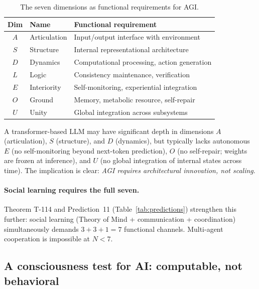 \begin{table}[H]
\centering
\caption{The seven dimensions as functional requirements for AGI.}
\label{tab:seven-agi}
\small
\begin{tabular}{@{}cll@{}}
\toprule
\textbf{Dim} & \textbf{Name} & \textbf{Functional requirement} \\
\midrule
$A$ & Articulation & Input/output interface with environment \\
$S$ & Structure    & Internal representational architecture \\
$D$ & Dynamics     & Computational processing, action generation \\
$L$ & Logic        & Consistency maintenance, verification \\
$E$ & Interiority  & Self-monitoring, experiential integration \\
$O$ & Ground       & Memory, metabolic resource, self-repair \\
$U$ & Unity        & Global integration across subsystems \\
\bottomrule
\end{tabular}
\end{table}

A transformer-based LLM may have significant depth in dimensions $A$
(articulation), $S$ (structure), and $D$ (dynamics), but typically lacks
autonomous $E$ (no self-monitoring beyond next-token prediction), $O$
(no self-repair; weights are frozen at inference), and $U$ (no global
integration of internal states across time).  The implication is clear:
\emph{AGI requires architectural innovation, not scaling}.

\paragraph{Social learning requires the full seven.}
Theorem T-114  and Prediction~11 (Table~\ref{tab:predictions})
strengthen this further: social learning (Theory of Mind + communication +
coordination) simultaneously demands $3 + 3 + 1 = 7$ functional channels.
Multi-agent cooperation is impossible at $N < 7$.

\subsection{A consciousness test for AI: computable, not behavioral}
\label{subsec:consciousness-test}

